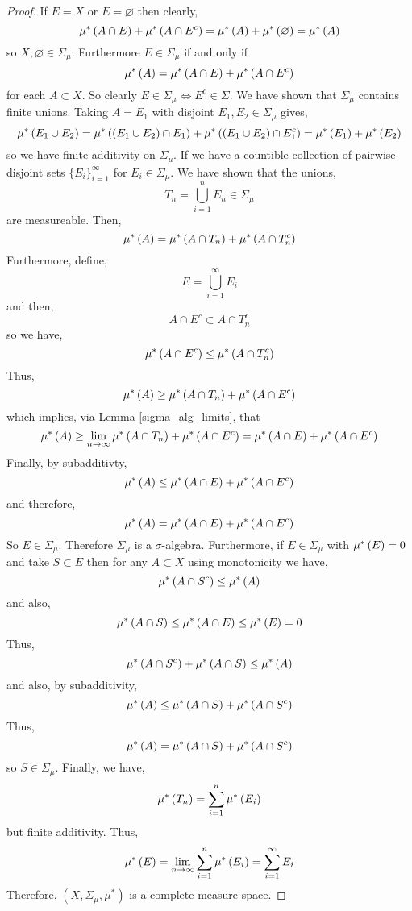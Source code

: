 \documentclass{article}
\theoremstyle{theorem}
\theoremstyle{definition}
\theoremstyle{definition}
\theoremstyle{remark}
\theoremstyle{definition}
\theoremstyle{remark}
\begin{document}
\begin{proof}
If $E = X$ or $E = \varnothing$ then clearly,
\[ \mu^*\left( A \cap E \right) + \mu^*\left( A \cap E^c \right) = \mu^*\left( A \right) + \mu^*\left( \varnothing \right) = \mu^*\left( A \right) \]
so $X, \varnothing \in \Sigma_{\mu}$. Furthermore $E \in \Sigma_{\mu}$ if and only if 
\[ \mu^*\left( A \right) = \mu^*\left( A \cap E \right) + \mu^*\left( A \cap E^c \right) \]
for each $A \subset X$. So clearly $E \in \Sigma_\mu \iff E^c \in \Sigma$.
We have shown that $\Sigma_\mu$ contains finite unions. Taking $A = E_1$ with disjoint $E_1, E_2 \in \Sigma_{\mu}$ gives,
\[ \mu^*\left( E_1 \cup E_2 \right) = \mu^*\left( (E_1 \cup E_2) \cap E_1 \right) + \mu^*\left( (E_1 \cup E_2) \cap E_1^c \right) = \mu^*\left( E_1 \right) + \mu^*\left( E_2 \right) \]
so we have finite additivity on $\Sigma_{\mu}$. 
If we have a countible collection of pairwise disjoint sets $\{ E_i \}_{i = 1}^{\infty}$ for $E_i \in \Sigma_\mu$. We have shown that the unions,
\[ T_n = \bigcup_{i = 1}^n E_n \in \Sigma_\mu \]
are measureable.  Then,
\[ \mu^*\left( A \right) = \mu^*\left( A \cap T_n \right) + \mu^*\left( A \cap T_n^c \right) \]
Furthermore, define,
\[ E = \bigcup_{i = 1}^\infty E_i \]
and then,
\[ A \cap E^c \subset A \cap T_n^c \]
so we have,
\[ \mu^*\left( A \cap E^c \right) \le \mu^*\left( A \cap T_n^c \right) \]
Thus,
\[  \mu^*\left( A \right) \ge \mu^*\left( A \cap T_n \right) + \mu^*\left( A \cap E^c \right) \]
which implies, via Lemma \ref{sigma_alg_limits}, that
\[ \mu^*\left( A \right) \ge \lim_{n \to \infty} \mu^*\left( A \cap T_n \right) + \mu^*\left( A \cap E^c \right) = \mu^*\left( A \cap E \right) + \mu^*\left( A \cap E^c \right) \]
Finally, by subadditivty,
\[ \mu^*\left( A \right) \le \mu^*\left( A \cap E \right) + \mu^*\left( A \cap E^c \right) \]
and therefore, 
\[ \mu^*\left( A \right) = \mu^*\left( A \cap E \right) + \mu^*\left( A \cap E^c \right) \]
So $E \in \Sigma_\mu$. Therefore $\Sigma_{\mu}$ is a $\sigma$-algebra.
Furthermore, if $E \in \Sigma_{\mu}$ with $\mu^*\left( E \right) = 0$ and take $S \subset E$ then for any $A \subset X$ using monotonicity we have,
\[ \mu^*\left( A \cap S^c \right) \le \mu^*\left( A \right) \]
and also, 
\[ \mu^*\left( A \cap S \right) \le \mu^*\left( A \cap E \right) \le \mu^*\left( E \right) = 0 \]
Thus,
\[ \mu^*\left( A \cap S^c \right) + \mu^*\left( A \cap S \right) \le \mu^*\left( A \right) \]
and also, by subadditivity,
\[ \mu^*\left( A \right) \le \mu^*\left( A \cap S \right) + \mu^*\left( A \cap S^c \right) \]
Thus,
\[ \mu^*\left( A \right) = \mu^*\left( A \cap S \right) + \mu^*\left( A \cap S^c \right) \]
so $S \in \Sigma_{\mu}$.
Finally, we have,
\[ \mu^*\left( T_n \right) = \sum_{i = 1}^n \mu^*\left( E_i \right) \]
but finite additivity.
Thus,
\[ \mu^*\left( E \right) = \lim_{n \to \infty} \sum_{i = 1}^n \mu^*\left( E_i \right) = \sum_{i = 1}^{\infty} E_i \]
Therefore, $(X, \Sigma_{\mu}, \mu^*)$ is a complete measure space.   
\end{proof}
\end{document}
